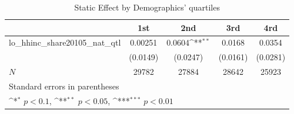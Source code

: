 \begin{table}[htbp]\centering
\def\sym#1{\ifmmode^{#1}\else\(^{#1}\)\fi}
\caption{Static Effect by Demographics' quartiles}
\begin{tabular}{l*{4}{c}}
\hline\hline
            &\multicolumn{1}{c}{1st}&\multicolumn{1}{c}{2nd}&\multicolumn{1}{c}{3rd}&\multicolumn{1}{c}{4rd}\\
\hline
lo\_hhinc\_share20105\_nat\_qtl&     0.00251         &      0.0604\sym{**} &      0.0168         &      0.0354         \\
            &    (0.0149)         &    (0.0247)         &    (0.0161)         &    (0.0281)         \\
\hline
\(N\)       &       29782         &       27884         &       28642         &       25923         \\
\hline\hline
\multicolumn{5}{l}{\footnotesize Standard errors in parentheses}\\
\multicolumn{5}{l}{\footnotesize \sym{*} \(p<0.1\), \sym{**} \(p<0.05\), \sym{***} \(p<0.01\)}\\
\end{tabular}
\end{table}
